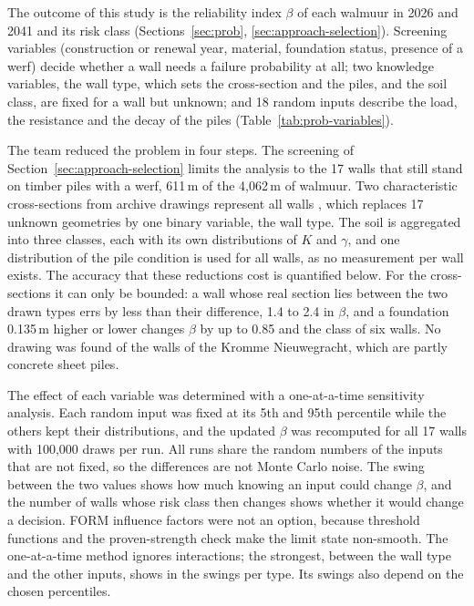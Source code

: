 The outcome of this study is the reliability index $\beta$ of each walmuur in
2026 and 2041 and its risk class (Sections~\ref{sec:prob},
\ref{sec:approach-selection}). Screening variables (construction or renewal
year, material, foundation status, presence of a werf) decide whether a wall
needs a failure probability at all; two knowledge variables, the wall type,
which sets the cross-section and the piles, and the soil class, are fixed for a
wall but unknown; and 18 random inputs describe the load, the resistance and
the decay of the piles (Table~\ref{tab:prob-variables}).

The team reduced the problem in four steps. The screening of
Section~\ref{sec:approach-selection} limits the analysis to the 17 walls that
still stand on timber piles with a werf, 611\,m of the 4{,}062\,m of walmuur.
Two characteristic cross-sections from archive drawings represent all walls
\parencite{ibu2010,erfgoed156}, which replaces 17 unknown geometries by one
binary variable, the wall type. The soil is aggregated into three classes, each
with its own distributions of $K$ and $\gamma$, and one distribution of the
pile condition is used for all walls, as no measurement per wall exists. The
accuracy that these reductions cost is quantified below. For the
cross-sections it can only be bounded: a wall whose real section lies between
the two drawn types errs by less than their difference, 1.4 to 2.4 in $\beta$,
and a foundation 0.135\,m higher or lower changes $\beta$ by up to 0.85 and the
class of six walls. No drawing was found of the walls of the Kromme
Nieuwegracht, which are partly concrete sheet piles.

The effect of each variable was determined with a one-at-a-time sensitivity
analysis. Each random input was fixed at its 5th and 95th percentile while the
others kept their distributions, and the updated $\beta$ was recomputed for
all 17 walls with 100{,}000 draws per run. All runs share the random numbers of
the inputs that are not fixed, so the differences are not Monte Carlo noise.
The swing between the two values shows how much knowing an input could change
$\beta$, and the number of walls whose risk class then changes shows whether it
would change a decision. FORM influence factors were not an option,
because threshold functions and the proven-strength check make the limit state
non-smooth. The one-at-a-time method ignores interactions; the strongest, between the wall type and the other inputs, shows in the swings per type. Its swings also depend on the chosen percentiles.

